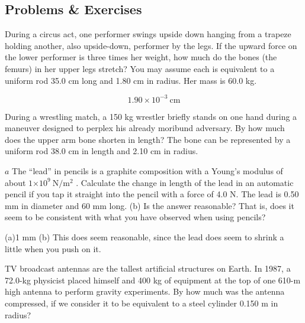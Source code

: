 \documentclass[
]{book}
\newenvironment{problems-exercises}{}{}
\begin{document}
\hypertarget{fs-id1165298820012}{}
\begin{problems-exercises}

\hypertarget{problems-exercises-11}{%
\subsection{Problems \& Exercises}\label{problems-exercises-11}}

\hypertarget{fs-id1165298795593}{}
\leavevmode\hypertarget{fs-id1165298795594}{}%
During a circus act, one performer swings upside down hanging from a
trapeze holding another, also upside-down, performer by the legs. If the
upward force on the lower performer is three times her weight, how much
do the bones (the femurs) in her upper legs stretch? You may assume each
is equivalent to a uniform rod 35.0 cm long and 1.80 cm in radius. Her
mass is 60.0 kg.

\hypertarget{fs-id1165298841662}{}
\leavevmode\hypertarget{eip-id1565399}{}%
\[{1\text{.}{\text{90} \times \text{10}^{- 3}}\ \text{cm}}{}\]

\hypertarget{fs-id1165298595705}{}
\leavevmode\hypertarget{fs-id1165298595706}{}%
During a wrestling match, a 150 kg wrestler briefly stands on one hand
during a maneuver designed to perplex his already moribund adversary. By
how much does the upper arm bone shorten in length? The bone can be
represented by a uniform rod 38.0 cm in length and 2.10 cm in radius.

\hypertarget{fs-id1165298778825}{}
\leavevmode\hypertarget{fs-id1165298778826}{}%
\(a\) The ``lead'' in pencils is a graphite composition with a Young's
modulus of about \({1{\times \text{10}^{9}}\ {\text{N}/\text{m}^{2}}}{}\)
. Calculate the change in length of the lead in an automatic pencil if
you tap it straight into the pencil with a force of 4.0 N. The lead is
0.50 mm in diameter and 60 mm long. (b) Is the answer reasonable? That
is, does it seem to be consistent with what you have observed when using
pencils?

\leavevmode\hypertarget{fs-id1165296220516}{}%
(a)1 mm {\hfill\break
}(b) This does seem reasonable, since the lead does
seem to shrink a little when you push on it.

\hypertarget{fs-id1165298941254}{}
\leavevmode\hypertarget{fs-id1165298941255}{}%
TV broadcast antennas are the tallest artificial structures on Earth. In
1987, a 72.0-kg physicist placed himself and 400 kg of equipment at the
top of one 610-m high antenna to perform gravity experiments. By how
much was the antenna compressed, if we consider it to be equivalent to a
steel cylinder 0.150 m in radius?


\end{problems-exercises}
\end{document}
